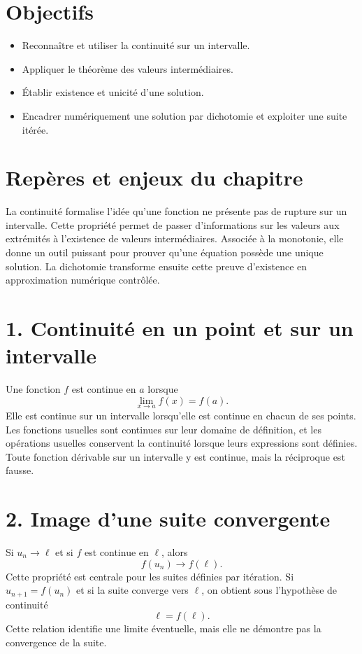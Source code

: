 
\section{Objectifs}
\begin{itemize}
\item Reconnaître et utiliser la continuité sur un intervalle.
\item Appliquer le théorème des valeurs intermédiaires.
\item Établir existence et unicité d’une solution.
\item Encadrer numériquement une solution par dichotomie et exploiter une suite itérée.
\end{itemize}

\section{Repères et enjeux du chapitre}
La continuité formalise l'idée qu'une fonction ne présente pas de rupture sur un intervalle. Cette propriété permet de passer d'informations sur les valeurs aux extrémités à l'existence de valeurs intermédiaires. Associée à la monotonie, elle donne un outil puissant pour prouver qu'une équation possède une unique solution. La dichotomie transforme ensuite cette preuve d'existence en approximation numérique contrôlée.

\section{1. Continuité en un point et sur un intervalle}
Une fonction $f$ est continue en $a$ lorsque
\[
\lim_{x\to a}f(x)=f(a).
\]
Elle est continue sur un intervalle lorsqu'elle est continue en chacun de ses points. Les fonctions usuelles sont continues sur leur domaine de définition, et les opérations usuelles conservent la continuité lorsque leurs expressions sont définies. Toute fonction dérivable sur un intervalle y est continue, mais la réciproque est fausse.

\section{2. Image d’une suite convergente}
Si $u_n\to\ell$ et si $f$ est continue en $\ell$, alors
\[
f(u_n)\to f(\ell).
\]
Cette propriété est centrale pour les suites définies par itération. Si $u_{n+1}=f(u_n)$ et si la suite converge vers $\ell$, on obtient sous l'hypothèse de continuité
\[
\ell=f(\ell).
\]
Cette relation identifie une limite éventuelle, mais elle ne démontre pas la convergence de la suite.

